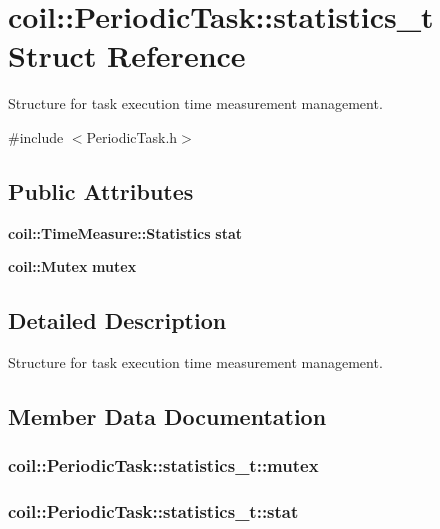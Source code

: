 \section{coil::PeriodicTask::statistics\_\-t Struct Reference}
\label{structcoil_1_1PeriodicTask_1_1statistics__t}


Structure for task execution time measurement management.  




{\ttfamily \#include $<$PeriodicTask.h$>$}

\subsection*{Public Attributes}
\begin{DoxyCompactItemize}
\item 
{\bf coil::TimeMeasure::Statistics} {\bf stat}
\item 
{\bf coil::Mutex} {\bf mutex}
\end{DoxyCompactItemize}


\subsection{Detailed Description}
Structure for task execution time measurement management. 

\subsection{Member Data Documentation}
\subsubsection[{mutex}]{ {\bf coil::PeriodicTask::statistics\_\-t::mutex}}\label{structcoil_1_1PeriodicTask_1_1statistics__t_afd06764a2da24b4a0900a9c8ff3d7127}
\subsubsection[{stat}]{ {\bf coil::PeriodicTask::statistics\_\-t::stat}}\label{structcoil_1_1PeriodicTask_1_1statistics__t_a43ec579612e368cd676e60558a8a9977}
